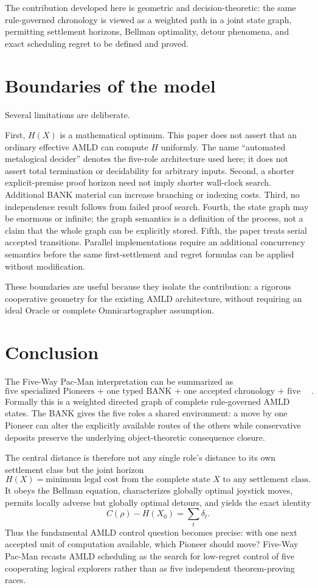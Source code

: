 \documentclass[11pt]{article}
\theoremstyle{remark}
\begin{document}
The contribution developed here is geometric and decision-theoretic: the same rule-governed chronology is viewed as a weighted path in a joint state graph, permitting settlement horizons, Bellman optimality, detour phenomena, and exact scheduling regret to be defined and proved.

\section{Boundaries of the model}

Several limitations are deliberate.

First, $H(X)$ is a mathematical optimum. This paper does not assert that an ordinary effective AMLD can compute $H$ uniformly. The name ``automated metalogical decider'' denotes the five-role architecture used here; it does not assert total termination or decidability for arbitrary inputs. Second, a shorter explicit-premise proof horizon need not imply shorter wall-clock search. Additional BANK material can increase branching or indexing costs. Third, no independence result follows from failed proof search. Fourth, the state graph may be enormous or infinite; the graph semantics is a definition of the process, not a claim that the whole graph can be explicitly stored. Fifth, the paper treats serial accepted transitions. Parallel implementations require an additional concurrency semantics before the same first-settlement and regret formulas can be applied without modification.

These boundaries are useful because they isolate the contribution: a rigorous cooperative geometry for the existing AMLD architecture, without requiring an ideal Oracle or complete Omnicartographer assumption.

\section{Conclusion}

The Five-Way Pac-Man interpretation can be summarized as
\[
\boxed{\text{five specialized Pioneers + one typed BANK + one accepted chronology + five exit classes}.}
\]
Formally this is a weighted directed graph of complete rule-governed AMLD states. The BANK gives the five roles a shared environment: a move by one Pioneer can alter the explicitly available routes of the others while conservative deposits preserve the underlying object-theoretic consequence closure.

The central distance is therefore not any single role's distance to its own settlement class but the joint horizon
\[
H(X)=\text{minimum legal cost from the complete state }X\text{ to any settlement class}.
\]
It obeys the Bellman equation, characterizes globally optimal joystick moves, permits locally adverse but globally optimal detours, and yields the exact identity
\[
\boxed{
C(\rho)-H(X_0)=\sum_t\delta_t.
}
\]
Thus the fundamental AMLD control question becomes precise: with one next accepted unit of computation available, which Pioneer should move? Five-Way Pac-Man recasts AMLD scheduling as the search for low-regret control of five cooperating logical explorers rather than as five independent theorem-proving races.
\end{document}
